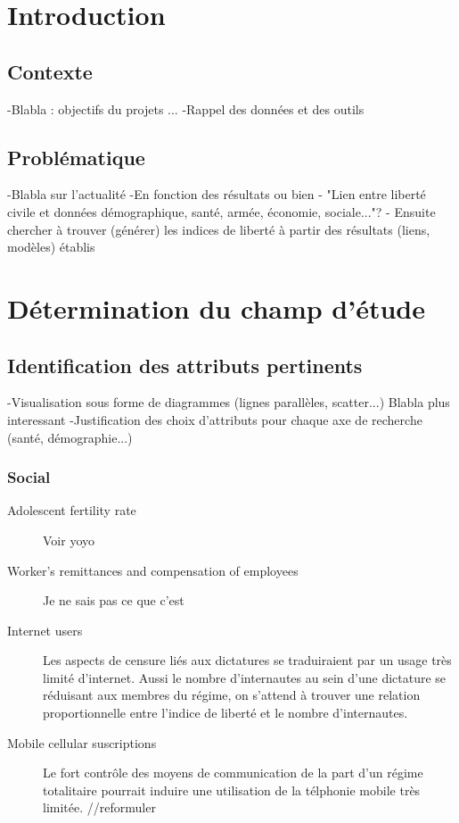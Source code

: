 \section{Introduction}
\subsection{Contexte}
-Blabla : objectifs du projets ...
-Rappel des données et des outils
\subsection{Problématique}
-Blabla sur l'actualité
-En fonction des résultats ou bien 
- "Lien entre liberté civile et données démographique, santé, armée, économie, sociale..."?
- Ensuite chercher à trouver (générer) les indices de liberté à partir des résultats (liens, modèles) établis
\section{Détermination du champ d'étude}
\subsection{Identification des attributs pertinents}
-Visualisation sous forme de diagrammes (lignes parallèles, scatter...)
Blabla plus interessant
-Justification des choix d'attributs pour chaque axe de recherche (santé, démographie...)
\subsubsection{Social}
\begin{description}
\item [Adolescent fertility rate] 
Voir yoyo
\item [Worker's remittances and compensation of employees]
Je ne sais pas ce que c'est
\item [Internet users]
Les aspects de censure liés aux dictatures se traduiraient par un usage très limité d'internet. Aussi le nombre d'internautes 
au sein d'une dictature se réduisant aux membres du régime, on s'attend à trouver une relation proportionnelle entre l'indice de liberté et le nombre d'internautes. 
\item [Mobile cellular suscriptions]
Le fort contrôle des moyens de communication de la part d'un régime totalitaire pourrait induire une utilisation de la télphonie mobile très limitée. //reformuler
 
\end{description} 
